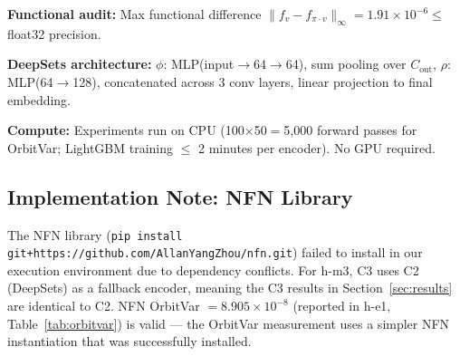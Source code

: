 \textbf{Functional audit:} Max functional difference $\|f_v - f_{\pi \cdot v}\|_\infty = 1.91 \times 10^{-6} \le$ float32 precision.

\textbf{DeepSets architecture:} $\phi$: MLP(input$\to$64$\to$64), sum pooling over $C_\text{out}$, $\rho$: MLP(64$\to$128), concatenated across 3 conv layers, linear projection to final embedding.

\textbf{Compute:} Experiments run on CPU (100$\times$50$=$5,000 forward passes for OrbitVar; LightGBM training $\le$ 2 minutes per encoder). No GPU required.

\subsection{Implementation Note: NFN Library}

The NFN library (\texttt{pip install git+https://github.com/AllanYangZhou/nfn.git}) failed to install in our execution environment due to dependency conflicts. For h-m3, C3 uses C2 (DeepSets) as a fallback encoder, meaning the C3 results in Section~\ref{sec:results} are identical to C2. NFN OrbitVar $= 8.905 \times 10^{-8}$ (reported in h-e1, Table~\ref{tab:orbitvar}) is valid --- the OrbitVar measurement uses a simpler NFN instantiation that was successfully installed.
